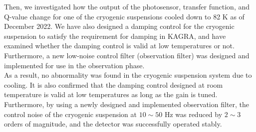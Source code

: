 {\qquad Then, we investigated how the output of the photosensor, transfer function, and Q-value change for one of the cryogenic suspensions cooled down to 82 K as of December 2022. We have also designed a damping control for the cryogenic suspension to satisfy the requirement for damping in KAGRA, and have examined whether the damping control is valid at low temperatures or not. Furthermore, a new low-noise control filter (observation filter) was designed and implemented for use in the observation phase.\\
\qquad As a result, no abnormality was found in the cryogenic suspension system due to cooling. It is also confirmed that the damping control designed at room temperature is valid at low temperatures as long as the gain is tuned. Furthermore, by using a newly designed and implemented observation filter, the control noise of the cryogenic suspension at $10\sim50$ Hz was reduced by $2\sim3$ orders of magnitude, and the detector was successfully operated stably.}
\clearpage